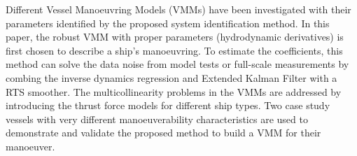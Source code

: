 Different Vessel Manoeuvring Models (VMMs) have been investigated with their parameters identified by the proposed system identification method. In this paper, the robust VMM with proper parameters (hydrodynamic derivatives) is first chosen to describe a ship’s manoeuvring. To estimate the coefficients, this method can solve the data noise from model tests or full-scale measurements by combing the inverse dynamics regression and Extended Kalman Filter with a RTS smoother. The multicollinearity problems in the VMMs are addressed by introducing the thrust force models for different ship types. Two case study vessels with very different manoeuverability characteristics are used to demonstrate and validate the proposed method to build a VMM for their manoeuver.